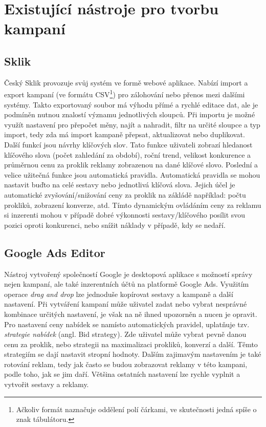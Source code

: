 \section{Existující nástroje pro tvorbu kampaní}

\subsection{Sklik}
Český Sklik provozuje svůj systém ve formě webové aplikace. Nabízí import a export kampaní 
(ve formátu CSV\footnote{Ačkoliv formát naznačuje oddělení polí čárkami, ve skutečnosti jedná spíše o znak tábulátoru.})
pro zálohování nebo přenos mezi dalšími systémy. Takto exportovaný soubor má výhodu přímé a rychlé editace dat, ale je podmíněn nutnou znalostí významu jednotlivých
sloupců. Při importu je možné využít nastavení pro přepočet měny, najít a nahradit, filtr na určité sloupce a typ import, tedy zda má import kampaně přepsat, aktualizovat
nebo duplikovat.
Další funkcí jsou návrhy klíčových slov. Tato funkce uživateli zobrazí hledanost klíčového slova (počet zahledání za období), roční trend, velikost konkurence a průměrnou
cenu za proklik reklamy zobrazenou na dané klíčové slovo. Poslední a velice užitečná funkce jsou automatická pravidla. Automatická pravidla se mohou nastavit buďto na
celé sestavy nebo jednotlivá klíčová slova. Jejich účel je automatické zvyšování/snižování ceny za proklik na zákládě například: počtu prokliků, zobrazení konverze, atd.
Tímto dynamickým ovládáním ceny za reklamu si inzerenti mohou v případě dobré výkonnosti sestavy/klíčového posílit svou pozici oproti konkurenci, nebo snížit náklady
v případě, kdy se nedaří.


\subsection{Google Ads Editor}
Nástroj vytvořený společností Google je desktopová aplikace s možností správy nejen kampaní, ale také inzerentních účtů na platformě Google Ads. Využitím operace
\emph{drag and drop} lze jednoduše kopírovat sestavy a kampaně a další nastavení. Při vytváření kampaní může uživatel zadat nebo vybrat nesprávné kombinace určitých
nastavení, je však na ně ihned upozorněn a nucen je opravit. Pro nastavení ceny nabídek se namísto automatických pravidel,
uplatňuje tzv. \emph{strategie nabídek} (angl. Bid strategy). Zde uživatel může vybrat pevně danou cenu za proklik, nebo strategii na maximalizaci prokliků, konverzí
a další. Těmto strategiím se dají nastavit stropní hodnoty. Dalším zajimavým nastavením je také rotování reklam, tedy jak často se budou zobrazovat reklamy v této
kampani, podle toho, jak se jim daří. Většina ostatních nastavení lze rychle vyplnit a vytvořit sestavy a reklamy.

